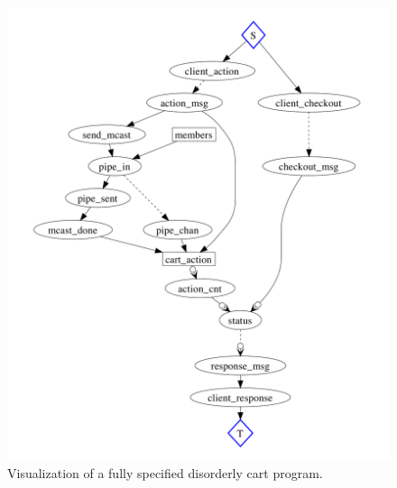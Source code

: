 \begin{figure}[t]
\centering
\includegraphics[width=1\linewidth]{fig/disorderly_complete.pdf}
\vspace{-10pt}
\caption{Visualization of a fully specified disorderly cart program.}
\label{fig:pdg-disorderly-analysis}
\vspace{-2pt}
\end{figure}


